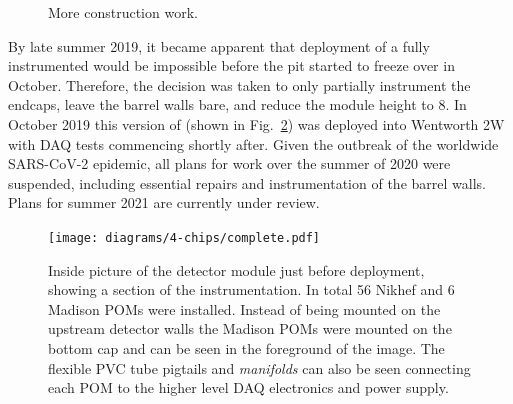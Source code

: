 \begin{figure} %
    \centering
    \quad
    \caption[More \chipsfive construction work]
    {More \chipsfive construction work.}
    \label{fig:work2}
\end{figure}

By late summer 2019, it became apparent that deployment of a fully instrumented \chipsfive would
be impossible before the pit started to freeze over in October. Therefore, the decision was taken
to only partially instrument the endcaps, leave the barrel walls bare, and reduce the module
height to \unit{8}{}. In October 2019 this version of \chipsfive (shown in
Fig.~\ref{fig:complete}) was deployed into Wentworth 2W with DAQ tests commencing shortly after.
Given the outbreak of the worldwide SARS-CoV-2 epidemic, all plans for work over the summer of
2020 were suspended, including essential repairs and instrumentation of the barrel walls. Plans
for summer 2021 are currently under review.

\begin{figure} %
    \texttt{[image: diagrams/4-chips/complete.pdf]}
    \caption[Inside picture of the \chipsfive detector module just before deployment]
    {Inside picture of the \chipsfive detector module just before deployment, showing a section of
        the instrumentation. In total 56 Nikhef and 6 Madison POMs were installed. Instead of
        being mounted on the upstream detector walls the Madison POMs were mounted on the bottom
        cap and can be seen in the foreground of the image. The flexible PVC tube pigtails and
        \emph{manifolds} can also be seen connecting each POM to the higher level DAQ electronics
        and power supply.}
    \label{fig:complete}
\end{figure}

